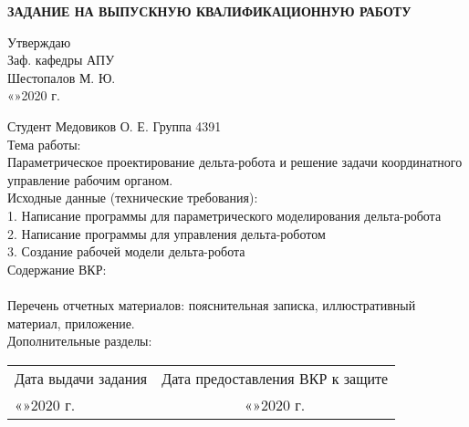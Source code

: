 
\newpage
\begin{center}
\large{\textbf{ЗАДАНИЕ НА ВЫПУСКНУЮ КВАЛИФИКАЦИОННУЮ РАБОТУ}}\\
\end{center}
\begin{flushright}
Утверждаю\\
Заф. кафедры АПУ\\
\underline{\hspace{3cm}} Шестопалов М. Ю.\\
«\underline{\hspace{0.7cm}}»\underline{\hspace{3cm}}2020 г.
\end{flushright}

\hfill \break
Студент Медовиков О. Е. \hspace{7cm} Группа 4391\\
Тема работы:\\ Параметрическое проектирование дельта-робота и решение задачи \hfill \break координатного управление рабочим органом.\\
Исходные данные (технические требования): \\
1. Написание программы для параметрического моделирования дельта-робота\\
2. Написание программы для управления дельта-роботом\\
3. Создание рабочей модели дельта-робота\\
Содержание ВКР:\\
\vspace{2cm} \\
Перечень отчетных материалов: пояснительная записка, иллюстративный\\ материал, приложение.\\
Дополнительные разделы:\\
\vspace{2cm}

\begin{tabular}{p{230pt}c}
Дата выдачи задания & Дата предоставления ВКР к защите\\
«\underline{\hspace{0.7cm}}»\underline{\hspace{3cm}}2020 г. &  «\underline{\hspace{0.7cm}}»\underline{\hspace{3cm}}2020 г.\\
\end{tabular}
\vspace{1cm}

